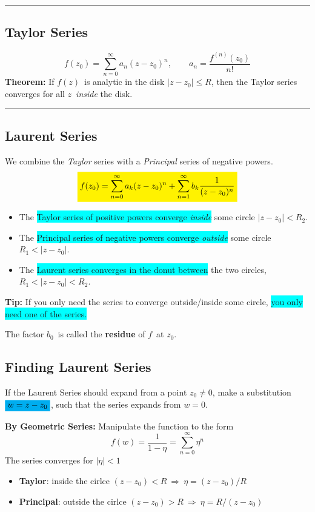 \documentclass[10pt,a4paper]{article}
\newcommand{\zeroinfsum}{\sum_{n=0}^{\infty}}
\newcommand{\holine}[1][\medskipamount]{\par\vspace*{\dimexpr-\parskip-\baselineskip+#1}\noindent\rule{\linewidth}{1pt}\par\vspace*{\dimexpr-\parskip-.5\baselineskip+#1}}
\newcommand{\yl}[1]{\colorbox{yellow}{$\displaystyle #1$}}
\newcommand{\bl}[1]{\colorbox{cyan}{$\displaystyle #1$}}
\newcommand{\bll}{\colorbox{cyan}}
\begin{document}
\begin{multicols}{2}
\holine
\subsection*{Taylor Series}
\[
    f(z_0) = \sum_{n=0}^\infty a_n(z-z_0)^n, \quad\quad a_n = \frac{f^{(n)}(z_0)}{n!}
\]
\textbf{Theorem:} If $f(z)$ is analytic in the disk $|z-z_0| \leq R$, then the Taylor series converges for all $z$ \textit{inside} the disk.



\holine
\subsection*{Laurent Series}
We combine the \textit{Taylor} series with a \textit{Principal} series of negative powers.
\[
\yl{
    f(z_0) = \sum_{n=0}^\infty a_k(z-z_0)^n + \sum_{n=1}^\infty b_k\frac{1}{(z-z_0)^n}
}
\]
\begin{itemize}
    \item The \bll{Taylor series of positive powers converge \textit{inside}} some circle $|z-z_0| < R_2$.
    \item The \bll{Principal series of negative powers converge \textit{outside}} some circle $R_1 < |z-z_0|$.
    \item The \bll{Laurent series converges in the donut between} the two circles, $R_1 < |z-z_0| < R_2$.
\end{itemize}
\textbf{Tip:} If you only need the series to converge outside/inside some circle, \bll{you only need one of the series.}

The factor $b_0$ is called the \textbf{residue} of $f$ at $z_0$.

\subsection*{Finding Laurent Series}
If the Laurent Series should expand from a point $z_0 \neq 0$, make a substitution $\bl{w = z - z_0}$, such that the series expands from $w=0$.

\textbf{By Geometric Series:} Manipulate the function to the form
\[
    f(w) = \frac{1}{1-\eta} = \zeroinfsum \eta^n
\]
The series converges for $|\eta| < 1$
\begin{itemize}
    \item \textbf{Taylor}: inside the cirlce $(z-z_0) < R\ \Rightarrow\ \eta = (z-z_0)/R$
    \item \textbf{Principal}: outside the cirlce $(z-z_0) > R\ \Rightarrow\ \eta = R/(z-z_0)$
\end{itemize}


\end{multicols}
\end{document}
